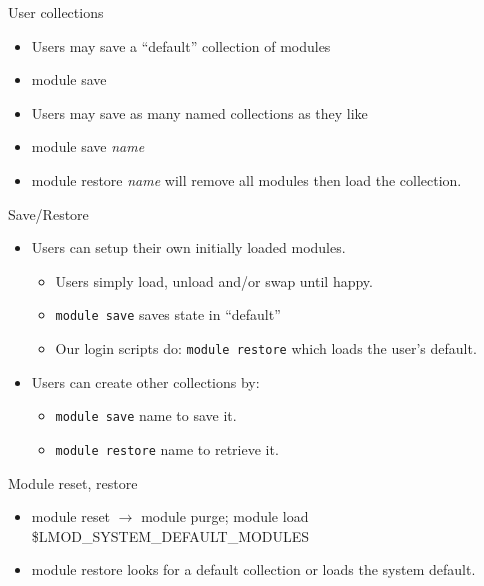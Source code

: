 \documentclass{beamer}
\begin{document}
\begin{frame}{User collections}
  \begin{itemize}
    \item Users may save a ``default'' collection of modules 
    \item module save 
    \item Users may save as many named collections as they like
    \item module save \emph{name}
    \item module restore \emph{name} will remove all modules then load
      the collection.
  \end{itemize}
\end{frame}

\begin{frame}{Save/Restore}
  \begin{itemize}
    \item Users can setup their own initially loaded modules.
      \begin{itemize}
        \item Users simply load, unload and/or swap until happy.
        \item {\color{blue}\texttt{module save}} saves state in ``default''
        \item Our login scripts do: {\color{blue}\texttt{module restore}}
          which loads the user's default.
      \end{itemize}
    \item Users can create other collections by:
      \begin{itemize}
        \item {\color{blue}\texttt{module save}
            {\color{violet}name}} to save it.
        \item {\color{blue}\texttt{module restore}
            {\color{violet}name}} to retrieve it.
      \end{itemize}
  \end{itemize}
\end{frame}

\begin{frame}{Module reset, restore}
  \begin{itemize}
    \item module reset $\rightarrow$ module purge; module load
      \$LMOD\_SYSTEM\_DEFAULT\_MODULES
    \item module restore looks for a default collection or loads the
      system default.
  \end{itemize}
\end{frame}
\end{document}
